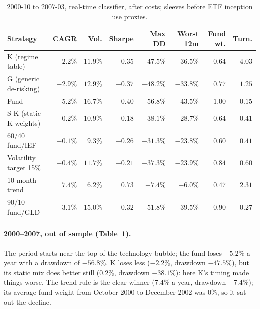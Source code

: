 \documentclass[11pt,a4paper]{article}
\begin{document}
\begin{table}[htbp]
\centering
\caption{2000-10 to 2007-03, real-time classifier, after costs; sleeves before ETF inception use proxies.}
\label{tab:p0}
\small
\setlength{\tabcolsep}{4pt}
\begin{tabular}{@{}lrrrrrrr@{}}
\toprule
Strategy & CAGR & Vol. & Sharpe & Max DD & Worst 12m & Fund wt. & Turn. \\
\midrule
K (regime table) & $-2.2\%$ & $11.9\%$ & $-0.35$ & $-47.5\%$ & $-36.5\%$ & $0.64$ & $4.03$ \\
G (generic de-risking) & $-2.9\%$ & $12.9\%$ & $-0.37$ & $-48.2\%$ & $-33.8\%$ & $0.77$ & $1.25$ \\
Fund & $-5.2\%$ & $16.7\%$ & $-0.40$ & $-56.8\%$ & $-43.5\%$ & $1.00$ & $0.15$ \\
S-K (static K weights) & $0.2\%$ & $10.9\%$ & $-0.18$ & $-38.1\%$ & $-28.7\%$ & $0.64$ & $0.41$ \\
60/40 fund/IEF & $-0.1\%$ & $9.3\%$ & $-0.26$ & $-31.3\%$ & $-23.8\%$ & $0.60$ & $0.41$ \\
Volatility target 15\% & $-0.4\%$ & $11.7\%$ & $-0.21$ & $-37.3\%$ & $-23.9\%$ & $0.84$ & $0.60$ \\
10-month trend & $7.4\%$ & $6.2\%$ & $0.73$ & $-7.4\%$ & $-6.0\%$ & $0.47$ & $2.31$ \\
90/10 fund/GLD & $-3.1\%$ & $15.0\%$ & $-0.32$ & $-51.8\%$ & $-39.5\%$ & $0.90$ & $0.27$ \\
\bottomrule
\end{tabular}
\end{table}

\paragraph{2000--2007, out of sample (Table~\ref{tab:p0}).} The period starts near the top of the technology bubble;
the fund loses $-5.2\%$ a year with a drawdown of $-56.8\%$. K loses less ($-2.2\%$, drawdown
$-47.5\%$), but its static mix does better still ($0.2\%$, drawdown $-38.1\%$): here K's timing made
things worse. The trend rule is the clear winner ($7.4\%$ a year, drawdown $-7.4\%$); its average fund
weight from October 2000 to December 2002 was $0\%$, so it sat out the decline.
\end{document}

